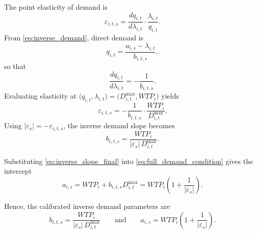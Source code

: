 \documentclass[11pt,a4paper]{article}
\begin{document}
The point elasticity of demand is
\begin{equation}
\varepsilon_{i,t,s}
=
\frac{dq_{i,t}}{d\lambda_{i,t}}
\cdot
\frac{\lambda_{i,t}}{q_{i,t}}.
\end{equation}
From \eqref{eq:inverse_demand}, direct demand is
\begin{equation}
q_{i,t} = \frac{a_{i,s}-\lambda_{i,t}}{b_{i,t,s}},
\end{equation}
so that
\begin{equation}
\frac{dq_{i,t}}{d\lambda_{i,t}} = -\frac{1}{b_{i,t,s}}.
\end{equation}
Evaluating elasticity at \(\bigl(q_{i,t},\lambda_{i,t}\bigr)=\bigl(D^{\max}_{i,t},WTP_i\bigr)\) yields
\begin{equation}
\varepsilon_{i,t,s}
=
-\frac{1}{b_{i,t,s}}
\cdot
\frac{WTP_i}{D^{\max}_{i,t}}.
\end{equation}
Using \(|\varepsilon_s|=-\varepsilon_{i,t,s}\), the inverse demand slope becomes
\begin{equation}
b_{i,t,s}
=
\frac{WTP_i}{|\varepsilon_s|\,D^{\max}_{i,t}}.
\label{eq:inverse_slope_final}
\end{equation}

Substituting \eqref{eq:inverse_slope_final} into \eqref{eq:full_demand_condition} gives the intercept
\begin{equation}
a_{i,s}
=
WTP_i + b_{i,t,s}D^{\max}_{i,t}
=
WTP_i\left(1+\frac{1}{|\varepsilon_s|}\right).
\label{eq:inverse_intercept_final}
\end{equation}

Hence, the calibrated inverse demand parameters are
\begin{equation}
\boxed{
b_{i,t,s}=\frac{WTP_i}{|\varepsilon_s|\,D^{\max}_{i,t}}
}
\qquad\text{and}\qquad
\boxed{
a_{i,s}=WTP_i\left(1+\frac{1}{|\varepsilon_s|}\right).
}
\end{equation}
\end{document}
